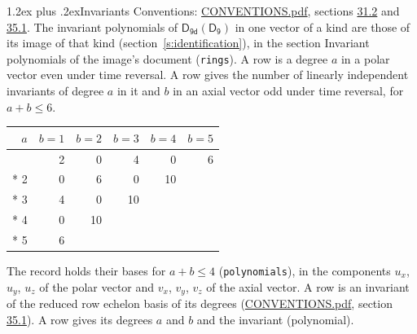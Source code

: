 \documentclass[10pt,a4paper]{article}
\makeatletter
\renewcommand\section{\@startsection{section}{1}{\z@}{-3ex plus -1ex minus -.2ex}%
  {1.2ex plus .2ex}{\normalfont\large\sffamily\bfseries\color{parttitle}}}
\numberwithin{equation}{section}
\newcommand{\grp}[1]{\mathsf{#1}}
\makeatother
\begin{document}
\section{Invariants}\label{s:invariants}
Conventions: \href{../../CONVENTIONS.pdf}{CONVENTIONS.pdf}, sections \href{../../CONVENTIONS.pdf\#conv.31.2}{31.2} and \href{../../CONVENTIONS.pdf\#conv.35.1}{35.1}.
The invariant polynomials of $\grp{D_{9d}}(\grp{D_{9}})$ in one vector of a kind are those of its image of that kind (section~\ref{s:identification}), in the section Invariant polynomials of the image's document (\texttt{rings}).
\leavevmode\label{n:index.degree.polar}\label{n:index.degree.axial}A row is a degree $a$ in a polar vector even under time reversal. A row gives the number of linearly independent invariants of degree $a$ in it and $b$ in an axial vector odd under time reversal, for $a + b \le 6$.
{\small\begin{longtable}{@{}rrrrrr@{}}\toprule
$a$ & $b = 1$ & $b = 2$ & $b = 3$ & $b = 4$ & $b = 5$\\\midrule\endhead
\bottomrule\endfoot\endlastfoot
1 & 2 & 0 & 4 & 0 & 6\\*
2 & 0 & 6 & 0 & 10 & \\*
3 & 4 & 0 & 10 &  & \\*
4 & 0 & 10 &  &  & \\*
5 & 6 &  &  &  & \\
\bottomrule\end{longtable}}
\leavevmode\label{n:local.component.polar}\label{n:local.component.axial}The record holds their bases for $a + b \le 4$ (\texttt{polynomials}), in the components $u_{x}$, $u_{y}$, $u_{z}$ of the polar vector and $v_{x}$, $v_{y}$, $v_{z}$ of the axial vector. \label{n:head.polynomial}A row is an invariant of the reduced row echelon basis of its degrees (\href{../../CONVENTIONS.pdf}{CONVENTIONS.pdf}, section \href{../../CONVENTIONS.pdf\#conv.35.1}{35.1}). A row gives its degrees $a$ and $b$ and the invariant (polynomial).
\end{document}
